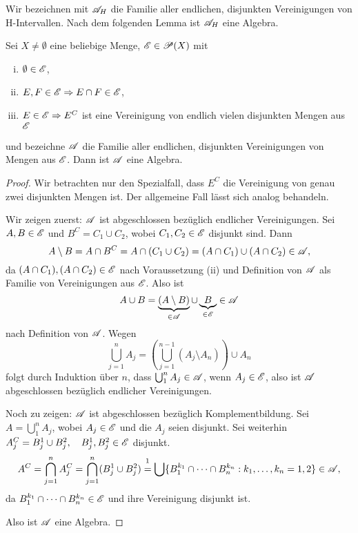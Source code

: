 Wir bezeichnen mit $\mathscr{A}_H$ die Familie aller endlichen, disjunkten Vereinigungen von H-Intervallen. Nach dem folgenden Lemma ist $\mathscr{A}_H$ eine Algebra.

\begin{lem}
 Sei $X \ne \emptyset$ eine beliebige Menge, $\mathscr{E} \in \mathscr{P}(X)$ mit
 \begin{enumerate}[(i)]
  \item $\emptyset \in \mathscr{E}$,
  \item $E,F \in \mathscr{E} \Rightarrow E \cap F \in \mathscr{E}$,
  \item $E \in \mathscr{E} \Rightarrow E^C$ ist eine Vereinigung von endlich vielen disjunkten Mengen aus $\mathscr{E}$
 \end{enumerate}
und bezeichne $\mathscr{A}$ die Familie aller endlichen, disjunkten Vereinigungen von Mengen aus $\mathscr{E}$. Dann ist $\mathscr{A}$ eine Algebra.
\end{lem}

\begin{proof}
 Wir betrachten nur den Spezialfall, dass $E^C$ die Vereinigung von genau zwei
 disjunkten Mengen ist. Der allgemeine Fall lässt sich analog behandeln.
 
 Wir zeigen zuerst: $\mathscr{A}$ ist abgeschlossen bezüglich endlicher Vereinigungen.
 Sei $A,B \in \mathscr{E}$ und $B^C = C_1 \cup C_2$, wobei $C_1, C_2 \in \mathscr{E}$ disjunkt
 sind. Dann
 \[ A \setminus B = A \cap B^C = A \cap( C_1 \cup C_2 ) = (A \cap C_1) \cup (A \cap C_2) \in \mathscr{A}, \]
 da $(A \cap C_1), (A \cap C_2) \in \mathscr{E}$ nach Voraussetzung (ii) und Definition
 von $\mathscr{A}$ als Familie von Vereinigungen aus $\mathscr{E}$. Also ist
 \[ A \cup B = \underbrace{(A \setminus B)}_{\in \mathscr{A}} \cup \underbrace{B}_{\in \mathscr{E}} \in \mathscr{A} \]
 nach Definition von $\mathscr{A}$. Wegen
 \[ \bigcup_{j=1}^n A_j = \left( \bigcup_{j=1}^{n-1}( A_j \setminus A_n ) \right) \cup A_n \]
 folgt durch Induktion über $n$, dass $\bigcup_1^n A_j \in \mathscr{A}$, wenn $A_j \in
 \mathscr{E}$, also ist $\mathscr{A}$ abgeschlossen bezüglich endlicher Vereinigungen. 
 
 Noch zu zeigen: $\mathscr{A}$ ist abgeschlossen bezüglich Komplementbildung. Sei $A =
 \bigcup_1^n A_j$, wobei $A_j \in \mathscr{E}$ und die $A_j$ seien disjunkt. Sei
 weiterhin $A_j^C = B_j^1 \cup B_j^2, \quad B_j^1, B_j^2 \in \mathscr{E}$ disjunkt. 
 \[ A^C = \bigcap_{j=1}^n A_j^C = \bigcap_{j=1}^n (B_j^1 \cup B_j^2) \overset{\footnotemark}{=} \bigcup \{ B_1^{k_1} \cap \cdots \cap B_n^{k_n} : k_1, \ldots, k_n = 1,2 \} \in \mA, \]
 da $B_1^{k_1} \cap \cdots \cap B_n^{k_n} \in \mathscr{E}$ und ihre Vereinigung disjunkt
 ist.
 
 Also ist $\mathscr{A}$ eine Algebra.
\end{proof}

